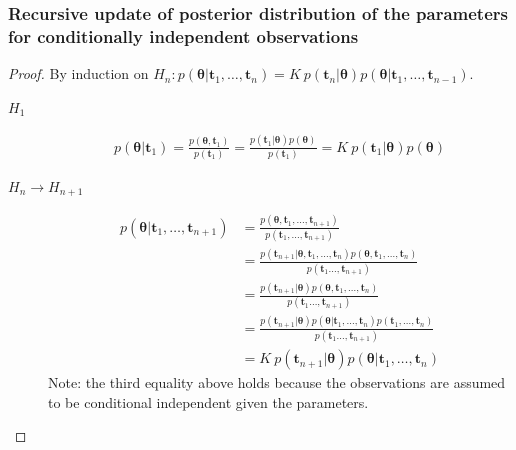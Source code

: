\begin{frame}
    \frametitle{Recursive update of posterior distribution of the parameters for conditionally independent observations}
	\tiny
	\begin{proof}
		By induction on $H_n: p(\boldsymbol{\theta}|\mathbf{t}_1,\ldots,\mathbf{t}_n)=K\ p(\mathbf{t}_n|\boldsymbol{\theta})p(\boldsymbol{\theta}|\mathbf{t}_1,\ldots,\mathbf{t}_{n-1})$.
		\begin{description}
			\item[$H_1$]
				\begin{align*}
					p(\boldsymbol{\theta}|\mathbf{t}_1)=\frac{p(\boldsymbol{\theta},\mathbf{t}_1)}{p(\mathbf{t}_1)}=\frac{p(\mathbf{t}_1|\boldsymbol{\theta})p(\boldsymbol{\theta})}{p(\mathbf{t}_1)}=K\ p(\mathbf{t}_1|\boldsymbol{\theta})p(\boldsymbol{\theta})
				\end{align*}
			\item[$H_n\rightarrow H_{n+1}$]
				\begin{align*}
					p(\boldsymbol{\theta}|\mathbf{t}_1,\ldots,\mathbf{t}_{n+1})&=\frac{p(\boldsymbol{\theta},\mathbf{t}_1,\ldots,\mathbf{t}_{n+1})}{p(\mathbf{t}_1,\ldots,\mathbf{t}_{n+1})}\\
                                                                               &=\frac{p(\mathbf{t}_{n+1}|\boldsymbol{\theta},\mathbf{t}_1,\ldots,\mathbf{t}_n)p(\boldsymbol{\theta},\mathbf{t}_1,\ldots,\mathbf{t}_n)}{p(\mathbf{t}_1\ldots,\mathbf{t}_{n+1})}\\
                                                                               &=\frac{p(\mathbf{t}_{n+1}|\boldsymbol{\theta})p(\boldsymbol{\theta},\mathbf{t}_1,\ldots,\mathbf{t}_n)}{p(\mathbf{t}_1\ldots,\mathbf{t}_{n+1})}\\
                                                                               &=\frac{p(\mathbf{t}_{n+1}|\boldsymbol{\theta})p(\boldsymbol{\theta}|\mathbf{t}_1,\ldots,\mathbf{t}_n)p(\mathbf{t}_1,\ldots,\mathbf{t}_n)}{p(\mathbf{t}_1\ldots,\mathbf{t}_{n+1})}\\
                                                                               &=K\ p(\mathbf{t}_{n+1}|\boldsymbol{\theta})p(\boldsymbol{\theta}|\mathbf{t}_1,\ldots,\mathbf{t}_n)
				\end{align*}
				Note: the third equality above holds because the observations are assumed to be conditional independent given the parameters.
		\end{description}
	\end{proof}
	\normalsize
\end{frame}

